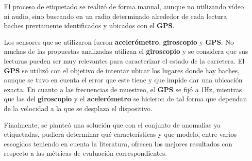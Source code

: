 	El proceso de etiquetado se realizó de forma manual, aunque no utilizando vídeo ni audio, sino buscando en un radio determinado alrededor de cada
	lectura baches previamente identificados y ubicados con el \textbf{GPS}.

	Los sensores que se utilizaron fueron \textbf{acelerómetro}, \textbf {giroscopio} y \textbf{GPS}. No muchas de las propuestas analizadas utilizan
	el \textbf{giroscopio} y se considera que sus lecturas pueden ser muy relevantes para caracterizar el estado de la carretera. El \textbf{GPS}
	se utilizó con el objetivo de intentar ubicar los lugares donde hay baches, aunque se tuvo en cuenta el error que este tiene y que impide dar
	una ubicación exacta. En cuanto a las frecuencias de muestreo, el \textbf{GPS} se fijó a 1Hz, mientras que las del \textbf{giroscopio} y el
	\textbf{acelerómetro} se hicieron de tal forma que dependan de la velocidad a la que se desplaza el dispositivo.

	Finalmente, se planteó una solución que con el conjunto de anomalías ya etiquetadas, pudiera determinar qué características y que modelo, entre
	varios escogidos teniendo en cuenta la literatura, ofrecen los mejores resultados con respecto a las métricas de evaluación correspondientes.
	

